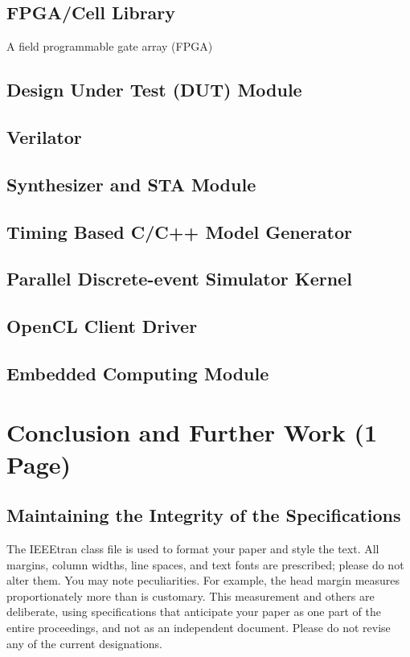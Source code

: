 \documentclass[conference]{IEEEtran}
\begin{document}
\subsection{FPGA/Cell Library}
A field programmable gate array (FPGA) 
\subsection{Design Under Test (DUT) Module}
\subsection{Verilator}
\subsection{Synthesizer and STA Module}
\subsection{Timing Based C/C++ Model Generator}
\subsection{Parallel Discrete-event Simulator Kernel}
\subsection{OpenCL Client Driver}
\subsection{Embedded Computing Module}
\section{Conclusion and Further Work (1 Page)}

\subsection{Maintaining the Integrity of the Specifications}

The IEEEtran class file is used to format your paper and style the text. All margins, 
column widths, line spaces, and text fonts are prescribed; please do not 
alter them. You may note peculiarities. For example, the head margin
measures proportionately more than is customary. This measurement 
and others are deliberate, using specifications that anticipate your paper 
as one part of the entire proceedings, and not as an independent document. 
Please do not revise any of the current designations.
\end{document}
